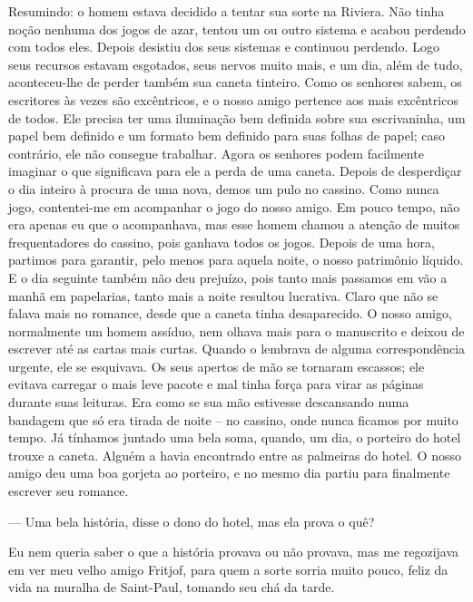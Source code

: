 Resumindo: o homem estava decidido a tentar sua sorte na Riviera. Não
tinha noção nenhuma dos jogos de azar, tentou um ou outro sistema e
acabou perdendo com todos eles. Depois desistiu dos seus sistemas e
continuou perdendo. Logo seus recursos estavam esgotados, seus nervos
muito mais, e um dia, além de tudo, aconteceu-lhe de perder também sua
caneta tinteiro. Como os senhores sabem, os escritores às vezes são
excêntricos, e o nosso amigo pertence aos mais excêntricos de todos. Ele
precisa ter uma iluminação bem definida sobre sua escrivaninha, um papel
bem definido e um formato bem definido para suas folhas de papel; caso
contrário, ele não consegue trabalhar. Agora os senhores podem
facilmente imaginar o que significava para ele a perda de uma caneta.
Depois de desperdiçar o dia inteiro à procura de uma nova, demos um pulo
no cassino. Como nunca jogo, contentei-me em acompanhar o jogo do nosso
amigo. Em pouco tempo, não era apenas eu que o acompanhava, mas esse
homem chamou a atenção de muitos frequentadores do cassino, pois ganhava
todos os jogos. Depois de uma hora, partimos para garantir, pelo menos
para aquela noite, o nosso patrimônio líquido. E o dia seguinte também
não deu prejuízo, pois tanto mais passamos em vão a manhã em papelarias,
tanto mais a noite resultou lucrativa. Claro que não se falava mais no
romance, desde que a caneta tinha desaparecido. O nosso amigo,
normalmente um homem assíduo, nem olhava mais para o manuscrito e deixou
de escrever até as cartas mais curtas. Quando o lembrava de alguma
correspondência urgente, ele se esquivava. Os seus apertos de mão se
tornaram escassos; ele evitava carregar o mais leve pacote e mal tinha
força para virar as páginas durante suas leituras. Era como se sua mão
estivesse descansando numa bandagem que só era tirada de noite -- no
cassino, onde nunca ficamos por muito tempo. Já tínhamos juntado uma bela
soma, quando, um dia, o porteiro do hotel trouxe a caneta. Alguém a
havia encontrado entre as palmeiras do hotel. O nosso amigo deu uma boa
gorjeta ao porteiro, e no mesmo dia partiu para finalmente escrever seu
romance.

--- Uma bela história, disse o dono do hotel, mas ela prova o quê?

Eu nem queria saber o que a história provava ou não provava, mas me
regozijava em ver meu velho amigo Fritjof, para quem a sorte sorria
muito pouco, feliz da vida na muralha de Saint-Paul, tomando seu chá da
tarde.

